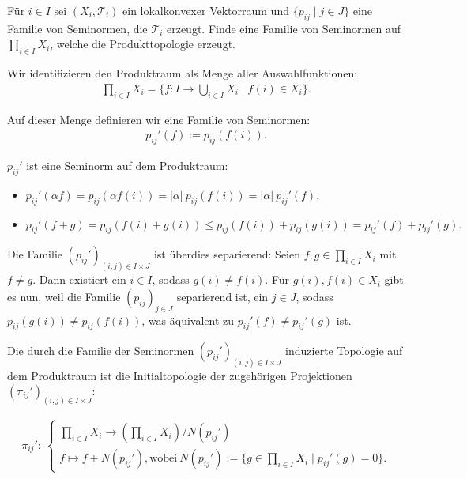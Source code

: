 \begin{exercise}
Für $i \in I$ sei $(X_i, \mathcal{T}_i)$ ein lokalkonvexer Vektorraum und
$\{p_{ij} \mid j \in J\}$ eine Familie von Seminormen, die $\mathcal{T}_i$ erzeugt.
Finde eine Familie von Seminormen auf $\prod_{i \in I} X_i$, welche die Produkttopologie erzeugt.

\end{exercise}

\begin{solution}



Wir identifizieren den Produktraum als Menge aller Auswahlfunktionen:
\begin{align*}
    \prod_{i \in I} X_i = \{f: I \rightarrow \bigcup_{i \in I} X_i \mid f(i) \in X_i\}.
\end{align*}

Auf dieser Menge definieren wir eine Familie von Seminormen:
\begin{align*}
    p_{ij}'(f) := p_{ij}(f(i)).
\end{align*}

$p_{ij}'$ ist eine Seminorm auf dem Produktraum:

\begin{itemize}
    \item $p_{ij}'(\alpha f) = p_{ij}(\alpha f(i)) = |\alpha|~ p_{ij}(f(i)) = |\alpha|~ p_{ij}'(f),$

    \item $p_{ij}'(f + g) = p_{ij}(f(i) + g(i)) \leq p_{ij}(f(i)) + p_{ij}(g(i)) = p_{ij}'(f) + p_{ij}'(g).$
\end{itemize}

Die Familie $(p_{ij}')_{(i,j) \in I \times J}$ ist überdies separierend: Seien $f, g \in \prod_{i \in I} X_i$ mit $f \neq g$. Dann existiert ein $i \in I$, sodass $g(i) \neq f(i)$. Für $g(i), f(i) \in X_i$ gibt es nun, weil die Familie $(p_{ij})_{j \in J}$ separierend ist, ein $j \in J$, sodass $p_{ij}(g(i)) \neq p_{ij}(f(i))$, was äquivalent zu $p_{ij}'(f) \neq p_{ij}'(g)$ ist.

Die durch die Familie der Seminormen $(p_{ij}')_{(i,j) \in I \times J}$ induzierte Topologie auf dem Produktraum ist die Initialtopologie der zugehörigen Projektionen $(\pi_{ij}')_{(i,j) \in I \times J}:$

\begin{align*}
  \pi_{ij}':
  ~\begin{cases}
    \prod_{i \in I} X_i \rightarrow (\prod_{i \in I} X_i) / N(p_{ij}')\\
    f \mapsto f + N(p_{ij}'), \text{wobei}~ N(p_{ij}') := \{g \in \prod_{i \in I} X_i \mid p_{ij}'(g) = 0\}.
  \end{cases}
\end{align*}


\end{solution}
